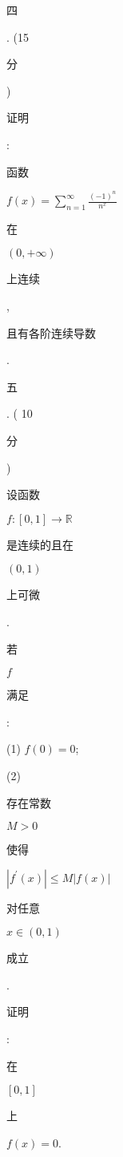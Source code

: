 \documentclass[10pt]{article}
\begin{document}
\begin{CJK}{UTF8}{mj}四\end{CJK}. (15 \begin{CJK}{UTF8}{mj}分\end{CJK}) \begin{CJK}{UTF8}{mj}证明\end{CJK}: \begin{CJK}{UTF8}{mj}函数\end{CJK} $f(x)=\sum_{n=1}^{\infty} \frac{(-1)^{n}}{n^{x}}$ \begin{CJK}{UTF8}{mj}在\end{CJK} $(0,+\infty)$ \begin{CJK}{UTF8}{mj}上连续\end{CJK}, \begin{CJK}{UTF8}{mj}且有各阶连续导数\end{CJK}.

\begin{CJK}{UTF8}{mj}五\end{CJK}. ( 10 \begin{CJK}{UTF8}{mj}分\end{CJK}) \begin{CJK}{UTF8}{mj}设函数\end{CJK} $f:[0,1] \rightarrow \mathbb{R}$ \begin{CJK}{UTF8}{mj}是连续的且在\end{CJK} $(0,1)$ \begin{CJK}{UTF8}{mj}上可微\end{CJK}. \begin{CJK}{UTF8}{mj}若\end{CJK} $f$ \begin{CJK}{UTF8}{mj}满足\end{CJK}:

(1) $f(0)=0$;

(2) \begin{CJK}{UTF8}{mj}存在常数\end{CJK} $M>0$ \begin{CJK}{UTF8}{mj}使得\end{CJK} $\left|f^{\prime}(x)\right| \leqslant M|f(x)|$ \begin{CJK}{UTF8}{mj}对任意\end{CJK} $x \in(0,1)$ \begin{CJK}{UTF8}{mj}成立\end{CJK}.

\begin{CJK}{UTF8}{mj}证明\end{CJK}: \begin{CJK}{UTF8}{mj}在\end{CJK} $[0,1]$ \begin{CJK}{UTF8}{mj}上\end{CJK} $f(x)=0$.
\end{document}
